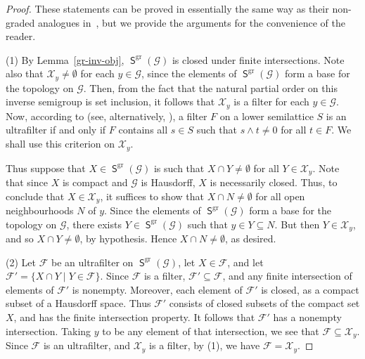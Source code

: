 \documentclass[a4paper,reqno,12pt]{amsart}
\numberwithin{equation}{section}
\theoremstyle{plain}
\theoremstyle{definition}
\newcommand{\gr}{\operatorname{gr}}
\newcommand{\SG}{\operatorname{\mathsf{S}}}
\begin{document}
\begin{proof}
These statements can be proved in essentially the same way as their non-graded analogues in~\cite[Lemma 2.36]{Lawson3}, but we provide the arguments for the convenience of the reader.

\smallskip

(1) By Lemma~\ref{gr-inv-obj}, $\SG^{\gr}(\mathscr{G})$ is closed under finite intersections. Note also that $\mathcal{X}_y \neq \emptyset$ for each $y \in \mathscr{G}$, since the elements of $\SG^{\gr}(\mathscr{G})$ form a base for the topology on $\mathscr{G}$. Then, from the fact that the natural partial order on this inverse semigroup is set inclusion, it follows that $\mathcal{X}_y$ is a filter for each $y \in \mathscr{G}$. Now, according to \cite[Lemma 9.1.2]{Lawson1} (see, alternatively, \cite[Lemma 2.6(2)]{Lawson3}), a filter $F$ on a lower semilattice $S$ is an ultrafilter if and only if $F$ contains all $s \in S$ such that $s\land t \neq 0$ for all $t \in F$. We shall use this criterion on $\mathcal{X}_y$.

Thus suppose that $X \in \SG^{\gr}(\mathscr{G})$ is such that $X \cap Y \neq \emptyset$ for all $Y \in \mathcal{X}_y$. Note that since $X$ is compact and $\mathscr{G}$ is Hausdorff, $X$ is necessarily closed. Thus, to conclude that $X \in \mathcal{X}_y$, it suffices to show that $X \cap N \neq \emptyset$ for all open neighbourhoods $N$ of $y$. Since the elements of $\SG^{\gr}(\mathscr{G})$ form a base for the topology on $\mathscr{G}$, there exists $Y \in \SG^{\gr}(\mathscr{G})$ such that $y \in Y \subseteq N$. But then $Y \in \mathcal{X}_y$, and so $X \cap Y \neq \emptyset$, by hypothesis. Hence $X \cap N \neq \emptyset$, as desired.

\smallskip

(2) Let $\mathcal{F}$ be an ultrafilter on $\SG^{\gr}(\mathscr{G})$, let $X \in \mathcal{F}$, and let $\mathcal{F}' = \{X \cap Y \mid Y \in \mathcal{F}\}$. Since $\mathcal{F}$ is a filter, $\mathcal{F}' \subseteq \mathcal{F}$, and any finite intersection of elements of $\mathcal{F}'$ is nonempty. Moreover, each element of $\mathcal{F}'$ is closed, as a compact subset of a Hausdorff space. Thus $\mathcal{F}'$ consists of closed subsets of the compact set $X$, and has the finite intersection property. It follows that $\mathcal{F}'$ has a nonempty intersection. Taking $y$ to be any element of that intersection, we see that $\mathcal{F} \subseteq \mathcal{X}_y$. Since $\mathcal{F}$ is an ultrafilter, and $\mathcal{X}_y$ is a filter, by (1), we have $\mathcal{F} = \mathcal{X}_y$.


\end{proof}
\end{document}

